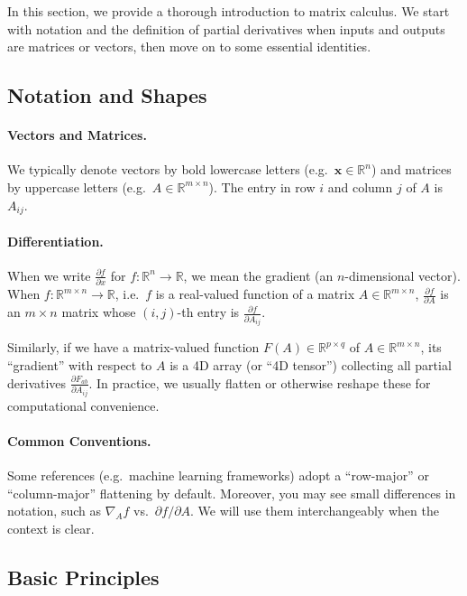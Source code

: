 \documentclass[11pt]{article}
\newcommand{\R}{\mathbb{R}}
\begin{document}
In this section, we provide a thorough introduction to matrix calculus. 
We start with notation and the definition of partial derivatives when inputs and outputs are matrices or vectors, 
then move on to some essential identities.

\subsection{Notation and Shapes}
\label{sec:notation}

\paragraph{Vectors and Matrices.}
We typically denote vectors by bold lowercase letters (e.g.\ $\mathbf{x} \in \R^n$) 
and matrices by uppercase letters (e.g.\ $A \in \R^{m \times n}$). 
The entry in row $i$ and column $j$ of $A$ is $A_{ij}$. 

\paragraph{Differentiation.}
When we write $\frac{\partial f}{\partial x}$ for $f : \R^n \to \R$, 
we mean the gradient (an $n$-dimensional vector). 
When $f : \R^{m \times n} \to \R$, i.e.\ $f$ is a real-valued function of a matrix $A \in \R^{m \times n}$, 
$\frac{\partial f}{\partial A}$ is an $m \times n$ matrix whose $(i,j)$-th entry is 
$\frac{\partial f}{\partial A_{ij}}$.

Similarly, if we have a matrix-valued function $F(A) \in \R^{p \times q}$ of $A \in \R^{m \times n}$, 
its “gradient” with respect to $A$ is a 4D array (or “4D tensor”) 
collecting all partial derivatives $\frac{\partial F_{ab}}{\partial A_{ij}}$. 
In practice, we usually flatten or otherwise reshape these for computational convenience.

\paragraph{Common Conventions.}
Some references (e.g.\ machine learning frameworks) adopt a “row-major” or “column-major” flattening by default. 
Moreover, you may see small differences in notation, such as $\nabla_{A} f$ vs.\ $\partial f / \partial A$. 
We will use them interchangeably when the context is clear.

\subsection{Basic Principles}
\end{document}

